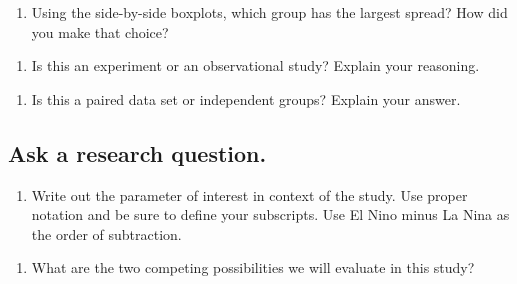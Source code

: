 \documentclass[
]{report}
\providecommand{\tightlist}{%
  \setlength{\itemsep}{0pt}\setlength{\parskip}{0pt}}
\begin{document}
\vspace{1in}

\begin{enumerate}
\def\labelenumi{\arabic{enumi}.}
\setcounter{enumi}{2}
\tightlist
\item
  Using the side-by-side boxplots, which group has the largest spread? How did you make that choice?
\end{enumerate}

\vspace{1in}

\begin{enumerate}
\def\labelenumi{\arabic{enumi}.}
\setcounter{enumi}{3}
\tightlist
\item
  Is this an experiment or an observational study? Explain your reasoning.
\end{enumerate}

\vspace{1in}

\begin{enumerate}
\def\labelenumi{\arabic{enumi}.}
\setcounter{enumi}{4}
\tightlist
\item
  Is this a paired data set or independent groups? Explain your answer.
\end{enumerate}

\vspace{1in}

\hypertarget{ask-a-research-question.}{%
\subsection{Ask a research question.}\label{ask-a-research-question.}}

\begin{enumerate}
\def\labelenumi{\arabic{enumi}.}
\setcounter{enumi}{5}
\tightlist
\item
  Write out the parameter of interest in context of the study. Use proper notation and be sure to define your subscripts. Use El Nino minus La Nina as the order of subtraction.
\end{enumerate}

\vspace{1in}

\begin{enumerate}
\def\labelenumi{\arabic{enumi}.}
\setcounter{enumi}{6}
\tightlist
\item
  What are the two competing possibilities we will evaluate in this study?
\end{enumerate}
\end{document}
